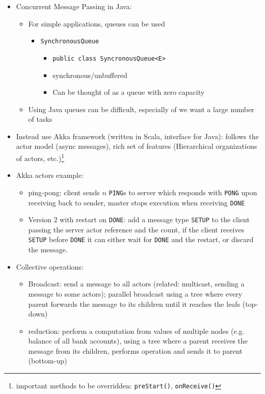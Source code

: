 \documentclass[a4paper]{article}
\newcommand{\inline}[1]{\lstinline!#1!}%
\begin{document}
\begin{itemize}
\begin{itemize}
\begin{itemize}
\begin{itemize}
\end{itemize}
\end{itemize}
\end{itemize}
\item Concurrent Message Passing in Java: 
\begin{itemize}
\item For simple applications, queues can be used
\begin{itemize}
\item \inline{SynchronousQueue}
\begin{itemize}
\item \inline{public class SyncronousQueue<E>}
\item synchronous/unbuffered
\item Can be thought of as a queue with zero capacity
\end{itemize}
\end{itemize}
\item Using Java queues can be difficult, especially of we want a large number of tasks
\end{itemize}
\item Instead use Akka framework (written in Scala, interface for Java): follows the actor model (async messages), rich set of features (Hierarchical organizations of actors, etc.)\footnote{important methods to be overridden: \inline{preStart()}, \inline{onReceive()}} 


\item Akka actors example: 
\begin{itemize}
\item ping-pong: client sends $n$ \inline{PING}s to server which responds with \inline{PONG} upon receiving back to sender, master stops execution when receiving \inline{DONE}
\item Version 2 with restart on \inline{DONE}: add a message type \inline{SETUP} to the client passing the server actor reference and the count, if the client receives \inline{SETUP} before \inline{DONE} it can either wait for \inline{DONE} and the restart, or discard the message.
\end{itemize}
\item Collective operations: 
\begin{itemize}
\item Broadcast: send a message to all actors (related: multicast, sending a message to some actors); parallel broadcast using a tree where every parent forwards the message to its children until it reaches the leafs (top-down)
\item reduction: perform a computation from values of multiple nodes (e.g. balance of all bank accounts), using a tree where a parent receives the message from its children, performs operation and sends it to parent (bottom-up)
\end{itemize}
\end{itemize}
\end{document}
